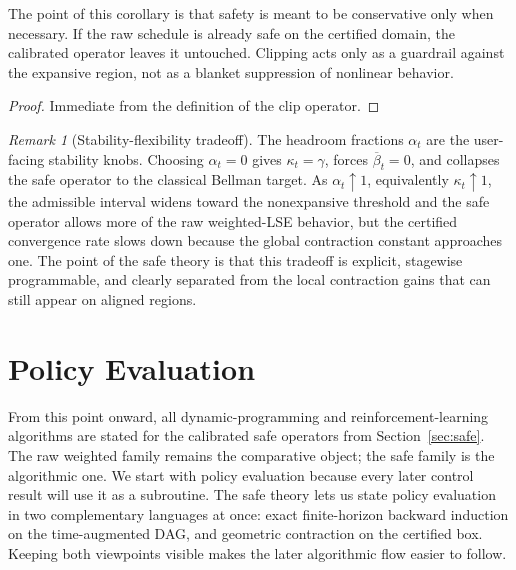 \documentclass{article}
\theoremstyle{remark}
\newtheorem{remark}[remark]{Remark}
\newcommand{\betacap}{\overline\beta}
\begin{document}
The point of this corollary is that safety is meant to be conservative only when necessary.
If the raw schedule is already safe on the certified domain, the calibrated operator leaves it untouched.
Clipping acts only as a guardrail against the expansive region, not as a blanket suppression of nonlinear behavior.

\begin{proof}
Immediate from the definition of the clip operator.
\end{proof}

\begin{remark}[Stability-flexibility tradeoff]
\label{rem:safety-tradeoff}
The headroom fractions $\alpha_t$ are the user-facing stability knobs.
Choosing $\alpha_t=0$ gives $\kappa_t=\gamma$, forces $\betacap_t=0$, and collapses the safe operator to the classical Bellman target.
As $\alpha_t\uparrow 1$, equivalently $\kappa_t\uparrow 1$, the admissible interval widens toward the nonexpansive threshold and the safe operator allows more of the raw weighted-LSE behavior, but the certified convergence rate slows down because the global contraction constant approaches one.
The point of the safe theory is that this tradeoff is explicit, stagewise programmable, and clearly separated from the local contraction gains that can still appear on aligned regions.
\end{remark}

\section{Policy Evaluation}
\label{sec:policy-eval}

From this point onward, all dynamic-programming and reinforcement-learning algorithms are stated for the calibrated safe operators from Section~\ref{sec:safe}.
The raw weighted family remains the comparative object; the safe family is the algorithmic one.
We start with policy evaluation because every later control result will use it as a subroutine.
The safe theory lets us state policy evaluation in two complementary languages at once: exact finite-horizon backward induction on the time-augmented DAG, and geometric contraction on the certified box.
Keeping both viewpoints visible makes the later algorithmic flow easier to follow.
\end{document}
